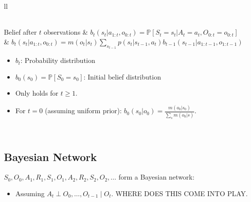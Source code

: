 \begin{summary}
\begin{center}
\begin{tabular}{ll}
{\begin{itemize}
\begin{itemize}
                \end{itemize}
            \end{itemize}
            } \\
            \midrule 
            Belief after $t$ observations &  $b_t(s_t | a_{1:t}, o_{0:t}) = \mathbb{P}[S_t = s_t | A_t = a_t, O_{0:t} = o_{0:t}]$ \\
            & $b_t(s_t | a_{1:t}, o_{0:t}) = m(o_t | s_t) \sum_{s_{t-1}} p(s_t | s_{t-1}, a_t) b_{t-1}(s_{t-1} | a_{1:t-1}, o_{1:t-1})$ \\
            {
            \begin{itemize}
                \item $b_t$: Probability distribution
                \item $b_0(s_0) = \mathbb{P}[S_0 = s_0]$: Initial belief distribution
                \item Only holds for $t \geq 1$.
                \item For $t = 0$ (assuming uniform prior): $b_0(s_0 | o_0) = \frac{m(o_0 | s_0)}{\sum_s m(o_0 | s)}.$
            \end{itemize}
            } \\
            \bottomrule
        \end{tabular}
    \end{center}
\end{summary}
\newpage 

\subsection{Bayesian Network}
\begin{notes}
    $S_0, O_0, A_1, R_1, S_1, O_1, A_2, R_2, S_2, O_2, \dots$ form a Bayesian network:
    \begin{itemize}
        \item Assuming $A_t \perp O_0, \dots, O_{t-1} \mid O_t$. WHERE DOES THIS COME INTO PLAY. 
    \end{itemize}
\end{notes}
\newpage

\begin{example}
    
\end{example}